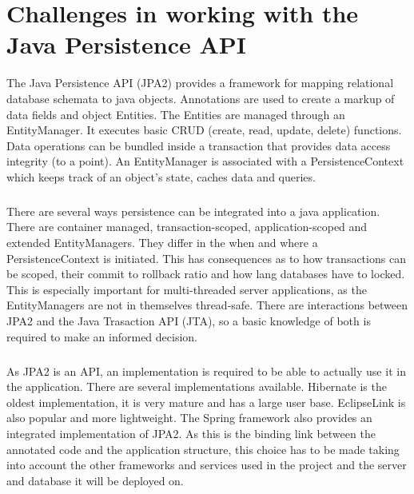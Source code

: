 \chapter{Challenges in working with the Java Persistence API}
The Java Persistence API (JPA2) provides a framework for mapping relational database schemata to java objects. Annotations are used to create a markup of data fields and object Entities. The Entities are managed through an EntityManager. It executes basic CRUD (create, read, update, delete) functions. Data operations can be bundled inside a transaction that provides data access integrity (to a point). An EntityManager is associated with a PersistenceContext which keeps track of an object's state, caches data and queries.\paragraph{}

There are several ways persistence can be integrated into a java application. There are container managed, transaction-scoped, application-scoped and extended EntityManagers. They differ in the when and where a PersistenceContext is initiated. This has consequences as to how transactions can be scoped, their commit to rollback ratio and how lang databases have to locked. This is especially important for multi-threaded server applications, as the EntityManagers are not in themselves thread-safe. There are interactions between JPA2 and the Java Trasaction API (JTA), so a basic knowledge of both is required to make an informed decision. \paragraph{}

As JPA2 is an API, an implementation is required to be able to actually use it in the application. There are several implementations available. Hibernate is the oldest implementation, it is very mature and has a large user base. EclipseLink is also popular and more lightweight. The Spring framework also provides an integrated implementation of JPA2.  As this is the binding link between the annotated code and the application structure, this choice has to be made taking into account the other frameworks and services used in the project and the server and database it will be deployed on. \paragraph{}

